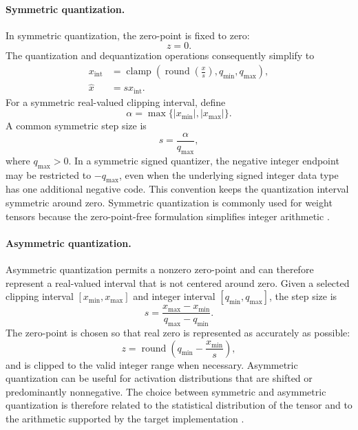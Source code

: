 \paragraph{Symmetric quantization.}
In symmetric quantization, the zero-point is fixed to zero:
\begin{equation}
    z=0.
    \label{eq:quant-symmetric-zero-point}
\end{equation}
The quantization and dequantization operations consequently simplify to
\begin{align}
    x_{\mathrm{int}}
    &=
    \operatorname{clamp}
    \left(
        \operatorname{round}\left(\frac{x}{s}\right),
        q_{\min},q_{\max}
    \right),
    \label{eq:quant-symmetric-integer}
    \\
    \widehat{x}
    &=
    s x_{\mathrm{int}}.
    \label{eq:quant-symmetric-reconstruction}
\end{align}
For a symmetric real-valued clipping interval, define
\begin{equation}
    \alpha=\max\{|x_{\min}|,|x_{\max}|\}.
    \label{eq:quant-symmetric-alpha}
\end{equation}
A common symmetric step size is
\begin{equation}
    s=\frac{\alpha}{q_{\max}},
    \label{eq:quant-symmetric-scale}
\end{equation}
where \(q_{\max}>0\). In a symmetric signed quantizer, the negative
integer endpoint may be restricted to \(-q_{\max}\), even when the
underlying signed integer data type has one additional negative code.
This convention keeps the quantization interval symmetric around zero.
Symmetric quantization is commonly used for weight tensors because the
zero-point-free formulation simplifies integer arithmetic
\parencite{song2026targetcentricqat,chen2026llmquantization}.

\paragraph{Asymmetric quantization.}
Asymmetric quantization permits a nonzero zero-point and can therefore
represent a real-valued interval that is not centered around zero. Given
a selected clipping interval \([x_{\min},x_{\max}]\) and integer interval
\([q_{\min},q_{\max}]\), the step size is
\begin{equation}
    s=
    \frac{x_{\max}-x_{\min}}
         {q_{\max}-q_{\min}}.
    \label{eq:quant-asymmetric-scale}
\end{equation}
The zero-point is chosen so that real zero is represented as accurately
as possible:
\begin{equation}
    z=
    \operatorname{round}
    \left(q_{\min}-\frac{x_{\min}}{s}\right),
    \label{eq:quant-asymmetric-zero-point}
\end{equation}
and is clipped to the valid integer range when necessary. Asymmetric
quantization can be useful for activation distributions that are shifted
or predominantly nonnegative. The choice between symmetric and
asymmetric quantization is therefore related to the statistical
distribution of the tensor and to the arithmetic supported by the target
implementation \parencite{song2026targetcentricqat,chen2026llmquantization}.

